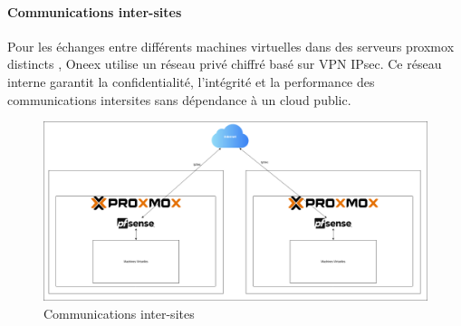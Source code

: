 \paragraph{Communications inter-sites}

Pour les échanges entre différents machines virtuelles dans des serveurs proxmox distincts , Oneex utilise un réseau privé chiffré basé sur VPN IPsec. Ce réseau interne garantit la confidentialité, l’intégrité et la performance des communications intersites sans dépendance à un cloud public.

\begin{figure} [H]
	\centering
	\includegraphics[width=.5\textwidth]{figures/Reseau intra proxmox.png}
	\caption{Communications inter-sites}
	\label{fig:Communications inter-sites}
\end{figure}
